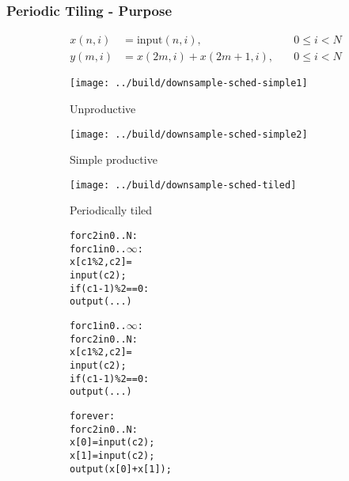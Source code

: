 \documentclass{beamer}
\begin{document}
\begin{frame}[fragile]
\frametitle{Periodic Tiling - Purpose}
{
\scriptsize
\begin{align}
x(n,i) &= \text{input}(n,i), \quad &0 \leq i < N\\
y(m,i) &= x(2m, i) + x(2m+1, i),  \quad &0 \leq i < N
\end{align}
}
\vspace{-2em}
\begin{figure}
    \begin{subfigure}[t]{0.32\textwidth}
        \texttt{[image: ../build/downsample-sched-simple1]}
        \caption{Unproductive}
        \label{fig:downsample-sched-pluto}
    \end{subfigure}
    \begin{subfigure}[t]{0.32\textwidth}
        \texttt{[image: ../build/downsample-sched-simple2]}
        \caption{Simple productive}
        \label{fig:downsample-sched-feasible}
    \end{subfigure}
    \begin{subfigure}[t]{0.32\textwidth}
        \texttt{[image: ../build/downsample-sched-tiled]}
        \caption{Periodically tiled}
        \label{fig:downsample-sched-periodic}
    \end{subfigure}

    \scriptsize
    \begin{subfigure}[b]{0.32\linewidth}
    \begin{alltt}
for c2 in 0..N:
  for c1 in 0..\(\infty\):
    x[c1\%2,c2] =
      input(c2);
    if (c1-1)\%2 == 0:
      output(...)
    \end{alltt}
    \end{subfigure}
    \begin{subfigure}[b]{0.32\linewidth}
    \begin{alltt}
for c1 in 0..\(\infty\):
  for c2 in 0..N:
    x[c1\%2,c2] =
      input(c2);
    if (c1-1)\%2 == 0:
      output(...)
    \end{alltt}
    \end{subfigure}
    \begin{subfigure}[b]{0.32\linewidth}
    \begin{alltt}
forever:
  for c2 in 0..N :
    x[0] = input(c2);
    x[1] = input(c2);
    output(x[0] + x[1]);
    \end{alltt}
    \end{subfigure}
\end{figure}

\end{frame}
\end{document}
